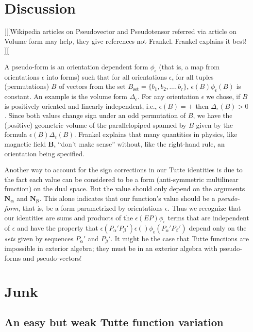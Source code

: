 \documentclass[Unicode]{cedram-alco}
\newcommand{\ext}[1]{\ensuremath{\mathbf{#1}}}
\begin{document}
\section{Discussion}
[[[Wikipedia articles on Pseudovector and Pseudotensor
      referred via article on Volume form may help, they give references not  Frankel.
      Frankel explains it best! ]]]

A pseudo-form\cite[p 85-87]{Frankel} is an orientation dependent form $\phi_\epsilon$ (that is, a
map from orientations $\epsilon$ into forms) such that
for all orientations $\epsilon$, for all tuples (permutations) $B$ of vectors from the
set $B_{\text{set}}=\{b_1, b_2, \ldots, b_r\}$, $\epsilon(B)\phi_\epsilon(B)$
is constant. An example is the volume form $\Delta_\epsilon$.
For any orientation $\epsilon$ we chose,
if $B$ is positively oriented and linearly independent, i.e., $\epsilon(B)=+$
then $\Delta_\epsilon(B)>0$.  Since both values change sign under an odd permutation
of $B$, we have the (positive) geometric volume of the
parallelopiped spanned by $B$ given by the formula $\epsilon(B)\Delta_\epsilon(B)$.
Frankel explains that many quantities in physics, like magnetic field $\ext{B}$,
``don't make sense'' without, like the right-hand rule,
an orientation being specified.


Another way to account for the sign corrections in our Tutte identities
is due to the fact each value can be considered to be a form (anti-symmetric
multilinear function) on the dual space. But the value should only depend
on the arguments $\ext{N_\alpha}$ and $\ext{N_\beta}$. This alone indicates
that our function's value should be a \emph{pseudo-form}, that is,
be a form parametrized by orientations $\epsilon$.  Thus we recognize that
our identities are sums and products of the $\epsilon(EP)\phi_\epsilon$ terms
that are independent of $\epsilon$ and have the property that
$\epsilon(P_\alpha'P_\beta')\epsilon()\phi_\epsilon(P_\alpha'P_\beta')$
depend only on the \emph{sets} given by sequences $P_\alpha'$ and $P_\beta'$.
It might be the case that Tutte functions are impossible in
exterior algebra; they must be in an exterior algebra with pseudo-forms
and pseudo-vectors!





\section{Junk}


\subsection{An easy but weak Tutte function variation}
\end{document}

